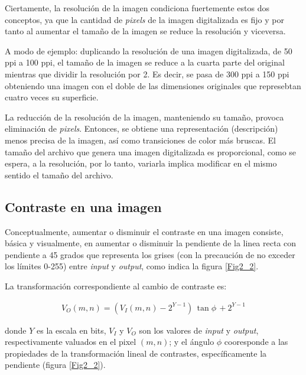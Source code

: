 %
Ciertamente, la resoluci\'on de la imagen condiciona fuertemente estos dos conceptos, ya que la cantidad de \textit{pixels} de la imagen digitalizada es 
fijo y por tanto al aumentar el tama\~no de la imagen se reduce la resoluci\'on y viceversa. 
%

%
A modo de ejemplo: duplicando la resoluci\'on de una imagen digitalizada, de 50 ppi a 100 ppi, el tama\~no de la imagen se reduce a la cuarta parte del 
original mientras que dividir la resoluci\'on por 2. Es decir, se pasa de 300 ppi a 150 ppi obteniendo una imagen con el doble de las dimensiones originales
que represebtan cuatro veces su superficie.
%

%
La reducci\'on de la resoluci\'on de la imagen, manteniendo su tama\~no, provoca eliminaci\'on de \textit{pixels}.
%
Entonces, se obtiene una representaci\'on (descripci\'on) menos precisa de la imagen, as\'i como transiciones de color m\'as bruscas. 
%
El tama\~no del archivo que genera una imagen digitalizada es proporcional, como se espera, a la resoluci\'on, por lo tanto, variarla implica modificar
en el mismo sentido el tama\~no del archivo.

\subsection{Contraste en una imagen}

Conceptualmente, aumentar o disminuir el contraste en una imagen consiste, b\'asica y visualmente, en aumentar o disminuir la pendiente de la linea recta 
con pendiente a 45 grados que representa los grises (con la precauci\'on de no exceder los l\'imites 0-255) entre \textit{input} y \textit{output}, como 
indica la figura \ref{Fig2_2}.
%

%
La transformaci\'on correspondiente al cambio de contraste es:

\begin{eqnarray}
	V_{O}(m, n) = \left( V_{I}(m, n) - 2^{Y - 1} \right) \, \tan{\phi} \, + 2^{Y - 1}
\label{EqXXV}
\end{eqnarray}

donde $Y$ es la escala en bits, $V_{I}$ y $V_{O}$ son los valores de \textit{input} y \textit{output}, respectivamente valuados en el pixel $(m, n)$; y el \'angulo $\phi$ cooresponde a 
las propiedades de la transformaci\'on lineal de contrastes, espec\'ificamente la pendiente (figura \ref{Fig2_2}).


